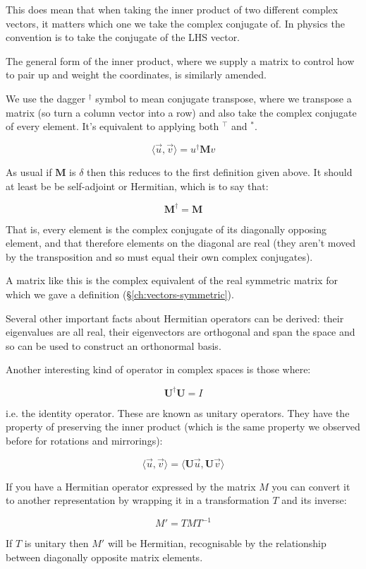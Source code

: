 This does mean that when taking the inner product of two different complex vectors, it matters which one we take the complex conjugate of. In physics the convention is to take the conjugate of the LHS vector.

The general form of the inner product, where we supply a matrix to control how to pair up and weight the coordinates, is similarly amended.

We use the dagger $^\dagger$ symbol to mean conjugate transpose, where we transpose a matrix (so turn a column vector into a row) and also take the complex conjugate of every element. It's equivalent to applying both $^\intercal$ and $^*$.

$$
\langle \vec{u}, \vec{v} \rangle
=
u^\dagger \mathbf{M} v
$$

As usual if $\mathbf{M}$ is $\delta$ then this reduces to the first definition given above. It should at least be be self-adjoint or Hermitian, which is to say that:

$$\mathbf{M}^\dagger = \mathbf{M}$$

That is, every element is the complex conjugate of its diagonally opposing element, and that therefore elements on the diagonal are real (they aren't moved by the transposition and so must equal their own complex conjugates).

A matrix like this is the complex equivalent of the real symmetric matrix for which we gave a definition (§\ref{ch:vectors-symmetric}).

Several other important facts about Hermitian operators can be derived: their eigenvalues are all real, their eigenvectors are orthogonal and span the space and so can be used to construct an orthonormal basis.

Another interesting kind of operator in complex spaces is those where:

$$\mathbf{U}^\dagger \mathbf{U} = I$$

i.e. the identity operator. These are known as unitary operators. They have the property of preserving the inner product (which is the same property we observed before for rotations and mirrorings):

$$\langle \vec{u}, \vec{v} \rangle = \langle \mathbf{U} \vec{u}, \mathbf{U} \vec{v} \rangle$$

If you have a Hermitian operator expressed by the matrix $M$ you can convert it to another representation by wrapping it in a transformation $T$ and its inverse:

$$M' = T M T^{-1}$$

If $T$ is unitary then $M'$ will be Hermitian, recognisable by the relationship between diagonally opposite matrix elements.